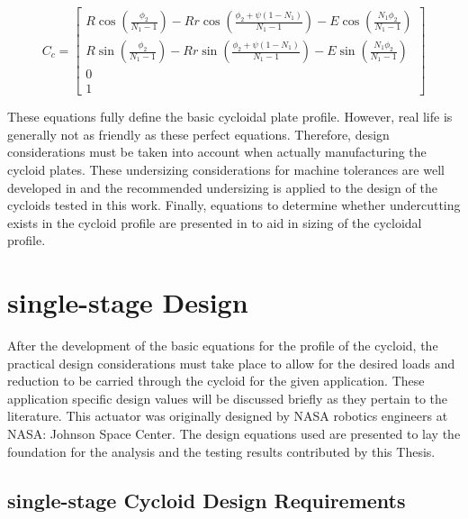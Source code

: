 \begin{equation} \label{eq:single_profile}
C_c = \left[\begin{array}{c}
		R\cos(\frac{\phi_2}{N_1 -1}) - Rr\cos(\frac{\phi_2 + \psi(1-N_1)}{N_1-1}) - E\cos(\frac{N_1\phi_2}{N_1-1})\\
		R\sin(\frac{\phi_2}{N_1 -1}) - Rr\sin(\frac{\phi_2 + \psi(1-N_1)}{N_1-1}) - E\sin(\frac{N_1\phi_2}{N_1-1})\\
		0\\
		1
		\end{array} \right]
\end{equation}

These equations fully define the basic cycloidal plate profile. However, real life is generally not as friendly as these perfect equations. Therefore, design considerations must be taken into account when actually manufacturing the cycloid plates. These undersizing considerations for machine tolerances are well developed in \cite{ref:design_and_application} and the recommended undersizing is applied to the design of the cycloids tested in this work. Finally, equations to determine whether undercutting exists in the cycloid profile are presented in \cite{ref:ye} to aid in sizing of the cycloidal profile. 



\section{single-stage Design} \label{ch:design:single}

After the development of the basic equations for the profile of the cycloid, the practical design considerations must take place to allow for the desired loads and reduction to be carried through the cycloid for the given application. These application specific design values will be discussed briefly as they pertain to the literature. This actuator was originally designed by NASA robotics engineers at NASA: Johnson Space Center. The design equations used are presented to lay the foundation for the analysis and the testing results contributed by this Thesis.

\subsection{single-stage Cycloid Design Requirements}


